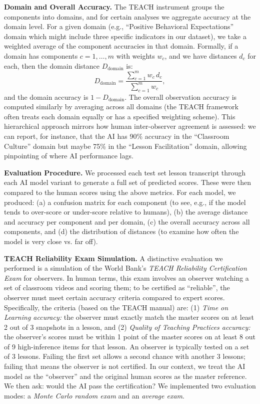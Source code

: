 \documentclass[12pt]{article}
\begin{document}
\textbf{Domain and Overall Accuracy.} The TEACH instrument groups the components into domains, and for certain analyses we aggregate accuracy at the domain level. For a given domain (e.g., “Positive Behavioral Expectations” domain which might include three specific indicators in our dataset), we take a weighted average of the component accuracies in that domain. Formally, if a domain has components \(c = 1,\dots,m\) with weights \(w_c\), and we have distances \(d_c\) for each, then the domain distance \(D_{\text{domain}}\) is:
\[
D_{\text{domain}} = \frac{\sum_{c=1}^{m} w_c \, d_c}{\sum_{c=1}^{m} w_c},
\]
and the domain accuracy is \(1 - D_{\text{domain}}\). The overall observation accuracy is computed similarly by averaging across all domains (the TEACH framework often treats each domain equally or has a specified weighting scheme). This hierarchical approach mirrors how human inter-observer agreement is assessed: we can report, for instance, that the AI has 90\% accuracy in the “Classroom Culture” domain but maybe 75\% in the “Lesson Facilitation” domain, allowing pinpointing of where AI performance lags.

\textbf{Evaluation Procedure.} We processed each test set lesson transcript through each AI model variant to generate a full set of predicted scores. These were then compared to the human scores using the above metrics. For each model, we produced: (a) a confusion matrix for each component (to see, e.g., if the model tends to over-score or under-score relative to humans), (b) the average distance and accuracy per component and per domain, (c) the overall accuracy across all components, and (d) the distribution of distances (to examine how often the model is very close vs. far off).

\textbf{TEACH Reliability Exam Simulation.} A distinctive evaluation we performed is a simulation of the World Bank’s \textit{TEACH Reliability Certification Exam} for observers. In human terms, this exam involves an observer watching a set of classroom videos and scoring them; to be certified as “reliable”, the observer must meet certain accuracy criteria compared to expert scores. Specifically, the criteria (based on the TEACH manual) are: (1) \textit{Time on Learning accuracy:} the observer must exactly match the master scores on at least 2 out of 3 snapshots in a lesson, and (2) \textit{Quality of Teaching Practices accuracy:} the observer’s scores must be within 1 point of the master scores on at least 8 out of 9 high-inference items for that lesson. An observer is typically tested on a set of 3 lessons. Failing the first set allows a second chance with another 3 lessons; failing that means the observer is not certified. In our context, we treat the AI model as the “observer” and the original human scores as the master reference. We then ask: would the AI pass the certification? We implemented two evaluation modes: a \textit{Monte Carlo random exam} and an \textit{average exam}.
\end{document}
